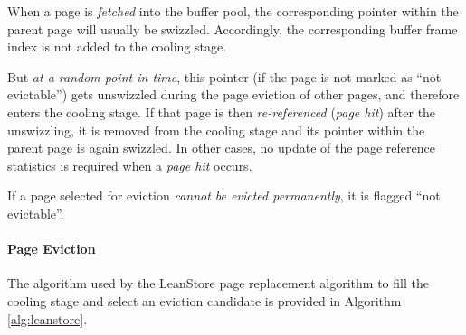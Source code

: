     When a page is \emph{fetched} into the buffer pool, the corresponding pointer within the parent page will usually be swizzled. Accordingly, the corresponding buffer frame index is not added to the cooling stage.

    But \emph{at a random point in time}, this pointer (if the page is not marked as ``not evictable'') gets unswizzled during the page eviction of other pages, and therefore enters the cooling stage. If that page is then \emph{re-referenced} (\emph{page hit}) after the unswizzling, it is removed from the cooling stage and its pointer within the parent page is again swizzled. In other cases, no update of the page reference statistics is required when a \emph{page hit} occurs.

    If a page selected for eviction \emph{cannot be evicted permanently}, it is flagged ``not evictable''.

\paragraph{Page Eviction}

    The algorithm used by the LeanStore page replacement algorithm to fill the cooling stage and select an eviction candidate is provided in Algorithm \ref{alg:leanstore}.

